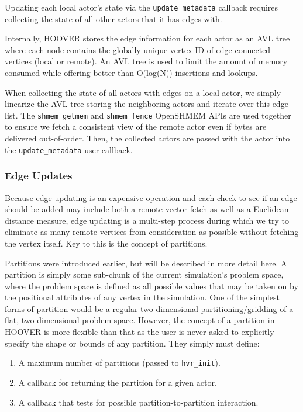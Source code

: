 Updating each local actor's state via the \texttt{update\_metadata} callback
requires collecting the state of all other actors that it has edges with.

Internally, HOOVER stores the edge information for each actor as an AVL tree
where each node contains the globally unique vertex ID of edge-connected
vertices (local or remote). An AVL tree is used to limit the amount of memory
consumed while offering better than O(log(N)) insertions and lookups.

When collecting the state of all actors with edges on a local actor, we simply
linearize the AVL tree storing the neighboring actors and iterate over this edge
list. The \texttt{shmem\_getmem} and \texttt{shmem\_fence} OpenSHMEM APIs are
used together to ensure we fetch a consistent view of the remote actor even if
bytes are delivered out-of-order. Then, the collected actors are passed with the
actor into the \texttt{update\_metadata} user callback.

\subsubsection{Edge Updates}

Because edge updating is an expensive operation and each check to see if an edge
should be added may include both a remote vector fetch as well as a Euclidean
distance measure, edge updating is a multi-step process during which we try to
eliminate as many remote vertices from consideration as possible without
fetching the vertex itself. Key to this is the concept of partitions.

Partitions were introduced earlier, but will be described in more detail here. A
partition is simply some sub-chunk of the current simulation's problem space,
where the problem space is defined as all possible values that may be taken on
by the positional attributes of any vertex in the simulation. One of the simplest
forms of partition would be a regular two-dimensional partitioning/gridding of a
flat, two-dimensional problem space. However, the concept of a partition in HOOVER
is more flexible than that as the user is never asked to explicitly specify the
shape or bounds of any partition. They simply must define:

\begin{enumerate}
    \item A maximum number of partitions (passed to \texttt{hvr\_init}).
    \item A callback for returning the partition for a given actor.
    \item A callback that tests for possible partition-to-partition interaction.
\end{enumerate}

